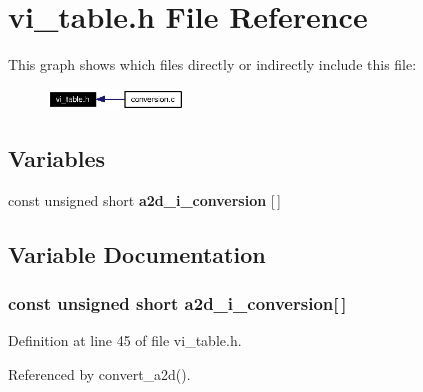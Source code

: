 \section{vi\_\-table.h File Reference}
\label{vi__table_8h}


This graph shows which files directly or indirectly include this file:\begin{figure}[H]
\begin{center}
\leavevmode
\includegraphics[width=102pt]{vi__table_8h__dep__incl}
\end{center}
\end{figure}
\subsection*{Variables}
\begin{CompactItemize}
\item 
const unsigned short {\bf a2d\_\-i\_\-conversion} [$\,$]
\end{CompactItemize}


\subsection{Variable Documentation}
\subsubsection{\setlength{\rightskip}{0pt plus 5cm}const unsigned short {\bf a2d\_\-i\_\-conversion}[$\,$]}\label{vi__table_8h_a0}




Definition at line 45 of file vi\_\-table.h.

Referenced by convert\_\-a2d().